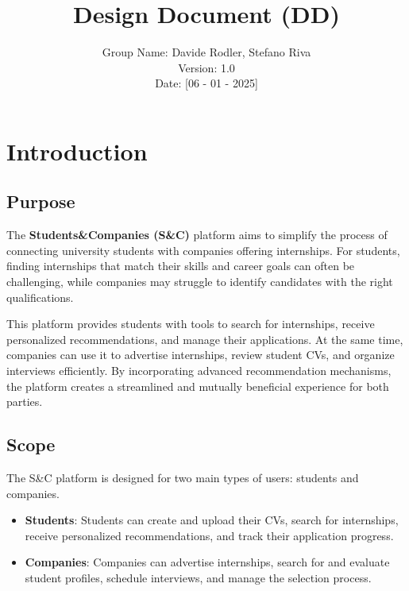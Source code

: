 \documentclass[12pt]{article}
\title{Design Document (DD)}
\author{Group Name: Davide Rodler, Stefano Riva \\ Version: 1.0 \\ Date: [06 - 01 - 2025]}
\date{}
\numberwithin{figure}{section}
\numberwithin{table}{section}
\begin{document}
\maketitle

\newpage

\tableofcontents

\newpage

\section{Introduction}

\subsection{Purpose}
\hspace{-0.8cm}
The \textbf{Students\&Companies (S\&C)} platform aims to simplify the process of connecting university students with companies offering internships. For students, finding internships that match their skills and career goals can often be challenging, while companies may struggle to identify candidates with the right qualifications.

\hspace{-0.8cm}
This platform provides students with tools to search for internships, receive personalized recommendations, and manage their applications. At the same time, companies can use it to advertise internships, review student CVs, and organize interviews efficiently. By incorporating advanced recommendation mechanisms, the platform creates a streamlined and mutually beneficial experience for both parties.

\subsection{Scope}
\hspace{-0.8cm}
The S\&C platform is designed for two main types of users: students and companies. 

\begin{itemize}
    \item \textbf{Students}: Students can create and upload their CVs, search for internships, receive personalized recommendations, and track their application progress.
    \item \textbf{Companies}: Companies can advertise internships, search for and evaluate student profiles, schedule interviews, and manage the selection process.
\end{itemize}
\end{document}
